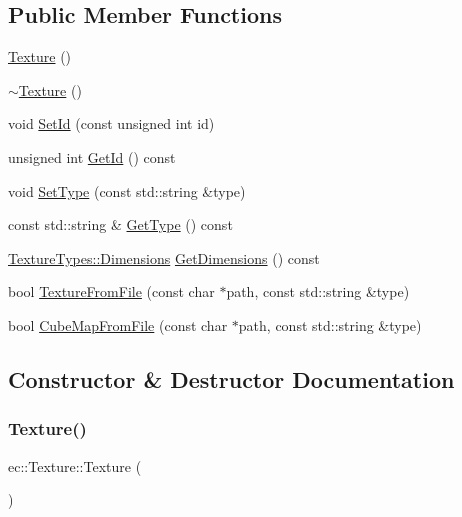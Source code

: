 \subsection*{Public Member Functions}
\begin{DoxyCompactItemize}
\item 
\mbox{\hyperlink{classec_1_1_texture_ac2551ef676d0c771f35dc470b8a0b237}{Texture}} ()
\item 
\mbox{\hyperlink{classec_1_1_texture_ae567d80654dd09c6b02a38ca8de29ead}{$\sim$\+Texture}} ()
\item 
void \mbox{\hyperlink{classec_1_1_texture_a83b67b45fa6991f79141f025dd5e269a}{Set\+Id}} (const unsigned int id)
\item 
unsigned int \mbox{\hyperlink{classec_1_1_texture_a141c573d98b174bfe15175913a9cfc34}{Get\+Id}} () const
\item 
void \mbox{\hyperlink{classec_1_1_texture_a190cc58745400d490ea492112196cb2d}{Set\+Type}} (const std\+::string \&type)
\item 
const std\+::string \& \mbox{\hyperlink{classec_1_1_texture_a5062d684caa000641817a918451eb76a}{Get\+Type}} () const
\item 
\mbox{\hyperlink{structec_1_1_texture_types_aa9ef510185cfe61d20918eb0b2c13501}{Texture\+Types\+::\+Dimensions}} \mbox{\hyperlink{classec_1_1_texture_a774a1f7dfefd55b01e7f645ba3b23660}{Get\+Dimensions}} () const
\item 
bool \mbox{\hyperlink{classec_1_1_texture_a4ad8c7559c57f05d993c895ea6820566}{Texture\+From\+File}} (const char $\ast$path, const std\+::string \&type)
\item 
bool \mbox{\hyperlink{classec_1_1_texture_a4ddfae4d7a899f946f3453ecf3652d51}{Cube\+Map\+From\+File}} (const char $\ast$path, const std\+::string \&type)
\end{DoxyCompactItemize}


\subsection{Constructor \& Destructor Documentation}
\mbox{\label{classec_1_1_texture_ac2551ef676d0c771f35dc470b8a0b237}} 
\subsubsection{\texorpdfstring{Texture()}{Texture()}}
{\footnotesize\ttfamily ec\+::\+Texture\+::\+Texture (\begin{DoxyParamCaption}{ }\end{DoxyParamCaption})\hspace{0.3cm}{\ttfamily [explicit]}}

